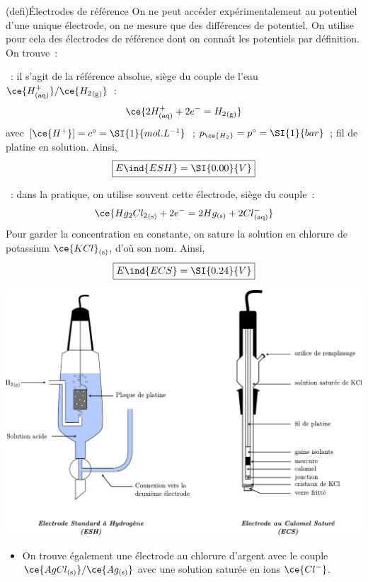 \documentclass[../../main/main.tex]{subfiles}
\begin{document}
\begin{tcb*}[breakable](defi){Électrodes de référence}
	On ne peut accéder expérimentalement au potentiel d'une unique électrode, on
	ne mesure que des différences de potentiel. On utilise pour cela des
	électrodes de référence dont on connaît les potentiels par définition. On
	trouve~:
	\begin{isd}[sidebyside align=top]
		\begin{itemize}
			~: il s'agit de la référence
			absolue, siège du couple de l'eau
			$\ce{{H}^+_{\rm(aq)}}/\ce{{H_2}_{\rm(g)}}$~:
			\[
				\ce{2 {H}^+_{\rm(aq)} + 2e^- = {H_2}_{\rm(g)}}
			\]
			avec $[\ce{H^+}] = c^\circ = \SI{1}{mol.L^{-1}}$~; $p_{\ce{H_2}} = p^\circ
				= \SI{1}{bar}$~; fil de platine en solution.
			Ainsi,
			\[
				\boxed{E\ind{ESH} = \SI{0.00}{V}}
			\]
		\end{itemize}
		\tcblower
		\begin{itemize}
			~: dans la pratique, on utilise
			souvent cette électrode, siège du couple~:
			\[
				\ce{{Hg_2Cl_2}_{\rm(s)} + 2e^- = 2 Hg_{\rm(s)} + 2 {Cl}^-_{\rm(aq)}}
			\]
			Pour garder la concentration en  constante, on sature la solution
			en chlorure de potassium $\ce{KCl}_{\rm(s)}$, d'où son nom. Ainsi,
			\[
				\boxed{E\ind{ECS} = \SI{0.24}{V}}
			\]
		\end{itemize}
	\end{isd}
	\begin{center}
		\includegraphics[width=.7\linewidth]{esh_ecs}
	\end{center}
	\begin{itemize}
		\item On trouve également une électrode au chlorure d'argent avec le
		      couple $\ce{AgCl_{\rm(s)}}/\ce{Ag_{\rm(s)}}$ avec une solution saturée
		      en ions $\ce{Cl^-}$.
	\end{itemize}
\end{tcb*}
\end{document}

